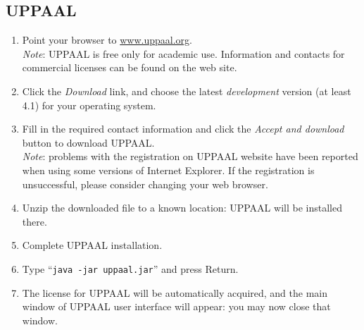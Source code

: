 \subsection{UPPAAL}\label{sec:install-uppaal}
\begin{enumerate}
\item Point your browser to \url{www.uppaal.org}.\\
\emph{Note}: UPPAAL is free only for
academic use. Information and contacts for commercial licenses can be found on the web site.
\item Click the \emph{Download} link, and choose the latest \emph{development} version (at least 4.1) for your operating system.
\item Fill in the required contact information and click the \emph{Accept and download} button to download UPPAAL.\\
\emph{Note}: problems with the registration on UPPAAL website have been reported when using some versions of Internet Explorer.
If the registration is unsuccessful, please consider changing your web browser.
\item Unzip the downloaded file to a known location: UPPAAL will be installed there.
\item\label{step:mac-install-uppaal} Complete UPPAAL installation. 
\item Type ``{\tt java -jar uppaal.jar}'' and press Return.
\item The license for UPPAAL will be automatically acquired, and the main window of UPPAAL user interface will appear:
you may now close that window.
\end{enumerate}

